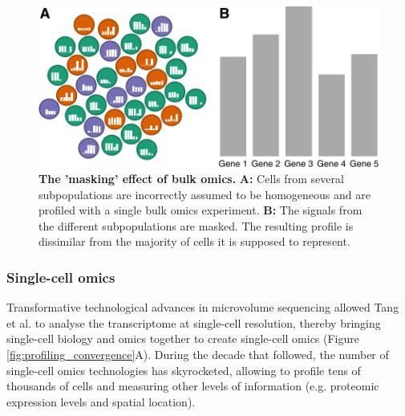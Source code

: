 \begin{figure}[htb!]
	\centering
	\includegraphics[width=\LARgefigure]{fig/bulk_vs_sc} 
	\caption{
		\textbf{The 'masking' effect of bulk omics.} 
		\textbf{A:} Cells from several subpopulations are incorrectly assumed to be homogeneous and are profiled with a single bulk omics experiment.
		\textbf{B:} The signals from the different subpopulations are masked. The resulting profile is dissimilar from the majority of cells it is supposed to represent.
	}
	\label{fig:bulk_vs_sc}
\end{figure}

\subsubsection{Single-cell omics}
Transformative technological advances in microvolume sequencing allowed Tang et al. to analyse the transcriptome at single-cell resolution\cite{tang_mrnaseqwholetranscriptomeanalysis_2009}, thereby bringing single-cell biology and omics together to create single-cell omics (Figure \ref{fig:profiling_convergence}A). During the decade that followed, the number of single-cell omics technologies has skyrocketed, allowing to profile tens of thousands of cells and measuring other levels of information (e.g. proteomic expression levels and spatial location).

